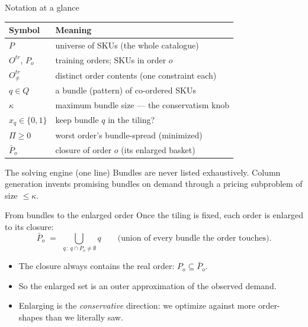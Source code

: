 \documentclass[11pt,aspectratio=169]{beamer}
\newcommand{\kk}{\kappa}
\begin{document}
\begin{frame}{Notation at a glance}
  \begin{center}
  \begin{tabular}{@{}ll@{}}
    \toprule
    Symbol & Meaning \\
    \midrule
    $P$ & universe of SKUs (the whole catalogue) \\
    $O^{tr}$, $P_o$ & training orders; SKUs in order $o$ \\
    $O^{tr}_{\neq}$ & distinct order contents (one constraint each) \\
    $q \in Q$ & a bundle (pattern) of co-ordered SKUs \\
    $\kk$ & maximum bundle size --- the conservatism knob \\
    $x_q \in \{0,1\}$ & keep bundle $q$ in the tiling? \\
    $\Pi \ge 0$ & worst order's bundle-spread (minimized) \\
    $\bar P_o$ & closure of order $o$ (its enlarged basket) \\
    \bottomrule
  \end{tabular}
  \end{center}
  \vspace{0.6em}
  \begin{block}{The solving engine (one line)}
    Bundles are never listed exhaustively. \alert{Column generation} invents
    promising bundles on demand through a pricing subproblem of size $\le \kk$.
  \end{block}
\end{frame}

\begin{frame}{From bundles to the enlarged order}
  Once the tiling is fixed, each order is enlarged to its closure:
  \[
    \bar P_o \;=\; \bigcup_{\,q\,:\, q \cap P_o \neq \emptyset} q
    \qquad\text{(union of every bundle the order touches).}
  \]
  \begin{itemize}
    \item The closure always \alert{contains} the real order: $P_o \subseteq \bar P_o$.
    \item So the enlarged set is an \alert{outer approximation} of the observed demand.
    \item Enlarging is the \emph{conservative} direction: we optimize against
          more order-shapes than we literally saw.
  \end{itemize}
\end{frame}

\end{document}
